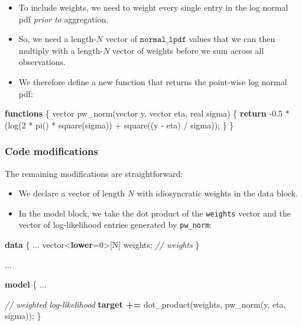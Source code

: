 \documentclass[
  11pt,
]{article}
\newenvironment{Shaded}{\begin{snugshade}}{\end{snugshade}}
\newcommand{\CommentTok}[1]{\textcolor[rgb]{0.56,0.35,0.01}{\textit{#1}}}
\newcommand{\ControlFlowTok}[1]{\textcolor[rgb]{0.13,0.29,0.53}{\textbf{#1}}}
\newcommand{\DataTypeTok}[1]{\textcolor[rgb]{0.13,0.29,0.53}{#1}}
\newcommand{\DecValTok}[1]{\textcolor[rgb]{0.00,0.00,0.81}{#1}}
\newcommand{\FloatTok}[1]{\textcolor[rgb]{0.00,0.00,0.81}{#1}}
\newcommand{\KeywordTok}[1]{\textcolor[rgb]{0.13,0.29,0.53}{\textbf{#1}}}
\newcommand{\NormalTok}[1]{#1}
\providecommand{\tightlist}{%
  \setlength{\itemsep}{0pt}\setlength{\parskip}{0pt}}
\begin{document}
\begin{itemize}
\tightlist
\item
  To include weights, we need to weight every single entry in the log normal pdf \emph{prior to} aggregation.
\item
  So, we need a length-\(N\) vector of \(\mathtt{normal\_lpdf}\) values that we can then multiply with a length-\(N\) vector of weights before we sum across all observations.
\item
  We therefore define a new function that returns the point-wise log normal pdf:
\end{itemize}

\begin{Shaded}
\begin{Highlighting}[]
\KeywordTok{functions}\NormalTok{ \{}
  \DataTypeTok{vector}\NormalTok{ pw\_norm(}\DataTypeTok{vector}\NormalTok{ y, }\DataTypeTok{vector}\NormalTok{ eta, }\DataTypeTok{real}\NormalTok{ sigma) \{}
    \ControlFlowTok{return}\NormalTok{ {-}}\FloatTok{0.5}\NormalTok{ * (log(}\DecValTok{2}\NormalTok{ * pi() * square(sigma)) + }
\NormalTok{                     square((y {-} eta) / sigma));}
\NormalTok{  \}}
\NormalTok{\}}
\end{Highlighting}
\end{Shaded}

\hypertarget{code-modifications}{%
\subsubsection{Code modifications}\label{code-modifications}}

The remaining modifications are straightforward:

\begin{itemize}
\tightlist
\item
  We declare a vector of length \(N\) with idiosyncratic weights in the data block.
\item
  In the model block, we take the dot product of the \texttt{weights} vector and the vector of log-likelihood entries generated by \texttt{pw\_norm}:
\end{itemize}

\begin{Shaded}
\begin{Highlighting}[]
\KeywordTok{data}\NormalTok{ \{}
\NormalTok{  ...}
  \DataTypeTok{vector}\NormalTok{\textless{}}\KeywordTok{lower}\NormalTok{=}\DecValTok{0}\NormalTok{\textgreater{}[N] weights;  }\CommentTok{// weights}
\NormalTok{\}}

\NormalTok{...}

\KeywordTok{model}\NormalTok{ \{}
\NormalTok{  ...}
  
  \CommentTok{// weighted log{-}likelihood}
  \KeywordTok{target +=}\NormalTok{ dot\_product(weights, pw\_norm(y, eta, sigma));}
\NormalTok{\}}
\end{Highlighting}
\end{Shaded}
\end{document}
